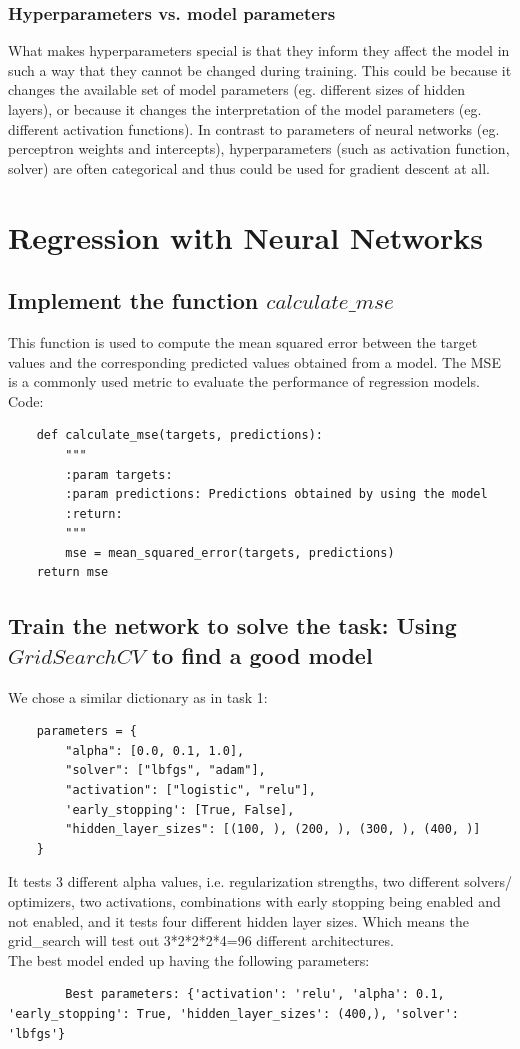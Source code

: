     \subsubsection{Hyperparameters vs. model parameters}
    What makes hyperparameters special is that they inform they affect the model in such a way that they cannot be changed during training.
    This could be because it changes the available set of model parameters (eg. different sizes of hidden layers),
    or because it changes the interpretation of the model parameters (eg. different activation functions).
    In contrast to parameters of neural networks (eg. perceptron weights and intercepts),
    hyperparameters (such as activation function, solver) are often categorical and thus could be used for gradient descent at all.

    \pagebreak
    
    \section{Regression with Neural Networks}
    \subsection{Implement the function $calculate\_mse$}

    This function is used to compute the mean squared error between the target values and the corresponding predicted values obtained from a model. The MSE is a commonly used metric to evaluate the performance of regression models.
    Code:
    \begin{lstlisting}
    def calculate_mse(targets, predictions):
        """
        :param targets:
        :param predictions: Predictions obtained by using the model
        :return:
        """
        mse = mean_squared_error(targets, predictions)
    return mse
    \end{lstlisting}
    \subsection{Train the network to solve the task: Using $GridSearchCV$ to find a good model}
    We chose a similar dictionary as in task 1:
    \begin{lstlisting}
    parameters = {
        "alpha": [0.0, 0.1, 1.0],
        "solver": ["lbfgs", "adam"],
        "activation": ["logistic", "relu"],
        'early_stopping': [True, False],
        "hidden_layer_sizes": [(100, ), (200, ), (300, ), (400, )]
    }
    \end{lstlisting}
    It tests 3 different alpha values, i.e. regularization strengths, two different solvers/ optimizers, two activations, combinations with early stopping being enabled and not enabled, and it tests four different hidden layer sizes. Which means the grid\_search will test out 3*2*2*2*4=96 different architectures.\\
    The best model ended up having the following parameters:
    \begin{lstlisting}
        Best parameters: {'activation': 'relu', 'alpha': 0.1, 'early_stopping': True, 'hidden_layer_sizes': (400,), 'solver': 'lbfgs'}
    \end{lstlisting}
